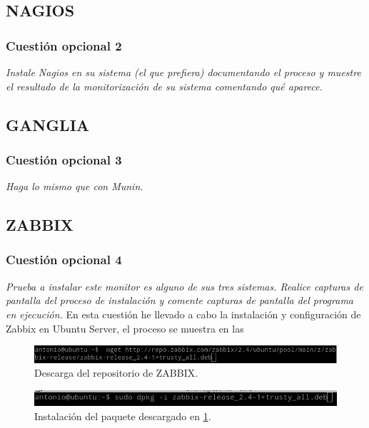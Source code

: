 \subsection{NAGIOS}
\subsubsection{Cuestión opcional 2}
\textit{Instale Nagios en su sistema (el que prefiera) documentando el proceso y muestre el resultado de la monitorización de su sistema comentando qué aparece.}

\subsection{GANGLIA}
\subsubsection{Cuestión opcional 3}
\textit{Haga lo mismo que con Munin.}

\subsection{ZABBIX}
\subsubsection{Cuestión opcional 4}
\textit{Prueba a instalar este monitor es alguno de sus tres sistemas. Realice capturas de pantalla del proceso de instalación y comente capturas de pantalla del programa en ejecución.}
En esta cuestión he llevado a cabo la instalación y configuración de Zabbix en Ubuntu Server, el proceso se muestra en las  \cite{zab}

\begin{figure}[H]
  \begin{center}
    \includegraphics[width=1\textwidth]{imagenes/zab1}
    \caption{Descarga del repositorio de ZABBIX.}
    \label{fig30}
  \end{center}
\end{figure}

\begin{figure}[H]
  \begin{center}
    \includegraphics[width=1\textwidth]{imagenes/zab2}
    \caption{Instalación del paquete descargado en \cref{fig30}.}
    \label{fig31}
  \end{center}
\end{figure}

